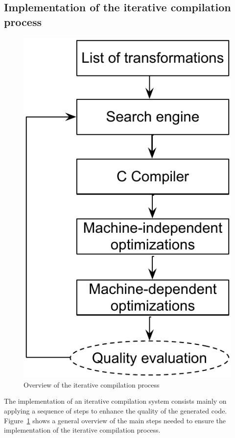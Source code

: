 
\subsection{Implementation of the iterative compilation process}
\begin{figure}[h]
	\center
	\includegraphics[scale=0.7]{SOTA/fig/iterative_compilation}
	\caption{Overview of the iterative compilation process}
	\label{fig:iterative_compilation}
\end{figure}
The implementation of an iterative compilation system consists mainly on applying a sequence of steps to enhance the quality of the generated code. Figure~\ref{fig:iterative_compilation} shows a general overview of the main steps needed to ensure the implementation of the iterative compilation process.
